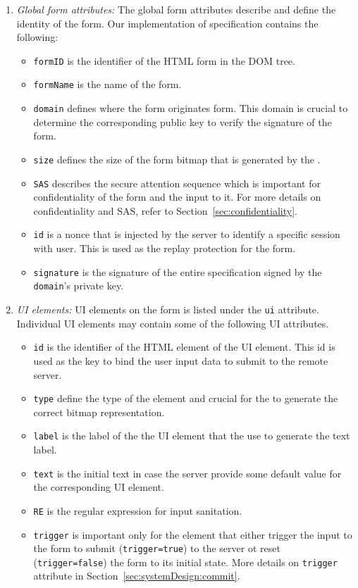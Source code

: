 \begin{enumerate}
  \item \emph{Global form attributes:} The global form attributes describe and define the identity of the form. Our implementation of \name specification contains the following:
  	\begin{itemize}
  	  \item \texttt{formID} is the identifier of the HTML form in the DOM tree.
  	  \item \texttt{formName} is the name of the form.
  	  \item \texttt{domain} defines where the form originates form. This domain is crucial to determine the corresponding public key to verify the signature of the form.  
  	  \item \texttt{size} defines the size of the form bitmap that is generated by the \device.
  	  \item \texttt{SAS} describes the secure attention sequence which is important for confidentiality of the form and the input to it. For more details on confidentiality and SAS, refer to Section~\ref{sec:confidentiality}.
  	  \item \texttt{id} is a nonce that is injected by the server to identify a specific session with user. This is used as the replay protection for the form. 
  	  \item \texttt{signature} is the signature of the entire specification signed by the \texttt{domain}'s private key.
  	\end{itemize}
  
  \item \emph{UI elements:} UI elements on the form is listed under the \texttt{ui} attribute. Individual UI elements may contain some of the following UI attributes.
  
  \begin{itemize}
    \item \texttt{id} is the identifier of the HTML element of the UI element. This id is used as the key to bind the user input data to submit to the remote server. 
    \item \texttt{type} define the type of the element and crucial for the \device to generate the correct bitmap representation. 
    \item \texttt{label} is the label of the the UI element that the \device use to generate the text label.
    \item \texttt{text} is the initial text in case the server provide some default value for the corresponding UI element.
    \item \texttt{RE} is the regular expression for input sanitation.
    \item \texttt{trigger} is important only for the element that either trigger the input to the form to submit (\texttt{trigger=true}) to the server ot reset (\texttt{trigger=false}) the form to its initial state. More details on \texttt{trigger} attribute in Section~\ref{sec:systemDesign:commit}.
  \end{itemize}
\end{enumerate}



